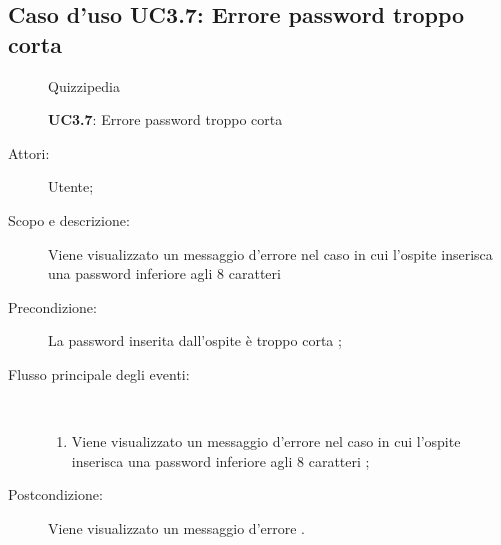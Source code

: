 \subsection{Caso d'uso UC3.7: Errore password troppo corta}
	\begin{figure}[H]
		\centering
		\begin{resizedtikzpicture}{\textwidth}
		\begin{umlsystem}[x=0, fill=lightgray!20]{Quizzipedia}
		\end{umlsystem}
		\end{resizedtikzpicture}
		\caption{\textbf{UC3.7}: Errore password troppo corta}
		\label{UC3.7}
	\end{figure}
\begin{description}
\item[Attori:] Utente;
\item[Scopo e descrizione:] Viene visualizzato un messaggio d'errore nel caso in cui l'ospite inserisca una password inferiore agli 8 caratteri

      \item[Precondizione:] La password inserita dall'ospite è troppo corta
;

        \item[Flusso principale degli eventi:] \ 
 \begin{enumerate}
          \item Viene visualizzato un messaggio d'errore nel caso in cui l'ospite inserisca una password inferiore agli 8 caratteri	;

      \end{enumerate}
    \item[Postcondizione:] Viene visualizzato un messaggio d'errore
.
  \end{description}
\hypertarget{UC4}{}

